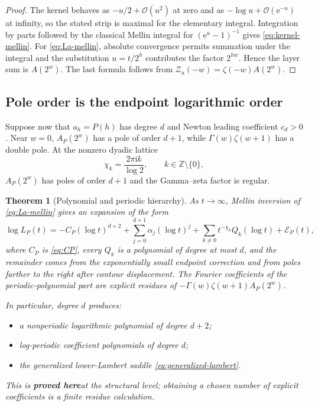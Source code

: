 \documentclass[11pt,oneside]{article}
\numberwithin{equation}{section}
\newtheorem{theorem}{Theorem}[section]
\theoremstyle{definition}
\theoremstyle{remark}
\newcommand{\Z}{\mathbb Z}
\newcommand{\e}{\mathrm e}
\newcommand{\ii}{\mathrm i}
\newcommand{\bigO}{\mathcal O}
\newcommand{\statusproved}{\textcolor{deepgreen}{\textbf{proved here}}}
\newcommand{\Zspec}{\mathcal Z}
\begin{document}
\begin{proof}
The kernel behaves as $-u/2+\bigO(u^2)$ at zero and as $-\log u+\bigO(\e^{-u})$ at infinity,
so the stated strip is maximal for the elementary integral.  Integration by parts followed
by the classical Mellin integral for $(\e^u-1)^{-1}$ gives
\eqref{eq:kernel-mellin}.  For \eqref{eq:La-mellin}, absolute convergence permits summation
under the integral and the substitution $u=t/2^h$ contributes the factor $2^{hw}$.
Hence the layer sum is $A(2^w)$.  The last formula follows from
$\Zspec_a(-w)=\zeta(-w)A(2^w)$.
\end{proof}

\subsection{Pole order is the endpoint logarithmic order}

Suppose now that $a_h=P(h)$ has degree $d$ and Newton leading coefficient $c_d>0$.  Near
$w=0$, $A_P(2^w)$ has a pole of order $d+1$, while
$\Gamma(w)\zeta(w+1)$ has a double pole.  At the nonzero dyadic lattice
\begin{equation}
 \chi_k=\frac{2\pi\ii k}{\log2},
 \qquad k\in\Z\setminus\{0\},
 \label{eq:dyadic-lattice}
\end{equation}
$A_P(2^w)$ has poles of order $d+1$ and the Gamma--zeta factor is regular.

\begin{theorem}[Polynomial and periodic hierarchy]
\label{thm:pole-hierarchy}
As $t\to\infty$, Mellin inversion of \eqref{eq:La-mellin} gives an expansion of the form
\begin{equation}
 \log L_P(t)
 =-C_P(\log t)^{d+2}
  +\sum_{j=0}^{d+1}\alpha_j(\log t)^j
  +\sum_{k\ne0}t^{-\chi_k}Q_k(\log t)
  +\mathcal E_P(t),
 \label{eq:logLP-structure}
\end{equation}
where $C_P$ is \eqref{eq:CP}, every $Q_k$ is a polynomial of degree at most $d$, and the
remainder comes from the exponentially small endpoint correction and from poles farther to
the right after contour displacement.  The Fourier coefficients of the periodic-polynomial
part are explicit residues of
$-\Gamma(w)\zeta(w+1)A_P(2^w)$.

In particular, degree $d$ produces:
\begin{itemize}
\item a nonperiodic logarithmic polynomial of degree $d+2$;
\item log-periodic coefficient polynomials of degree $d$;
\item the generalized lower-Lambert saddle \eqref{eq:generalized-lambert}.
\end{itemize}
This is \statusproved at the structural level; obtaining a chosen number of explicit
coefficients is a finite residue calculation.
\end{theorem}
\end{document}
